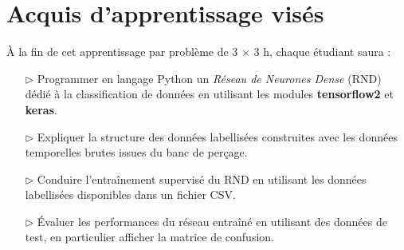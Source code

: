 \documentclass[11pt,french]{article}
\begin{document}

\renewcommand{\ttdefault}[0]{lmtt}
\newcommand{\boldtt}[1]{{\ttfamily\bfseries #1}}

\newcommand{\QtLogo}[0]{\texttt{[image: Images/QtLogo.projet]}}
\newcommand{\PyQt}[0]{\boldtt{PyQt5}}
\newcommand{\Qt}[0]{\boldtt{Qt}}

\begin{center}
\setlength{\fboxsep}{5mm}
\setlength{\fboxrule}{0.2mm}

\medskip
{}
\end{center}

\section*{Acquis d'apprentissage visés}

À la fin de cet apprentissage par problème de 3 $\times$ 3 h, chaque étudiant saura :
\begin{itemize}
\item[$\rhd$] Programmer en langage Python un {\em Réseau de Neurones Dense} (RND) dédié à la classification de données
  en utilisant les modules \boldtt{tensorflow2} et \boldtt{keras}.
\item[$\rhd$] Expliquer la structure des données labellisées construites avec les données temporelles brutes issues du banc de perçage.
\item[$\rhd$] Conduire l'entraînement supervisé du RND en utilisant les données labellisées disponibles dans un fichier CSV.
\item[$\rhd$] Évaluer les performances du réseau entraîné en utilisant des données de test, en particulier afficher la matrice de confusion.
\end{itemize}

\newpage
\vspace*{-16mm}
\end{document}
